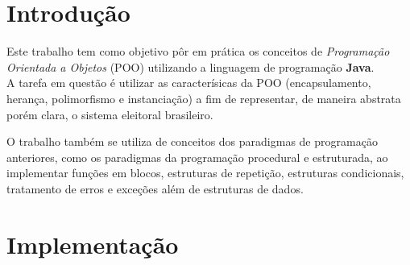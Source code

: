 \documentclass[
		12pt, %
		oneside, %
		a4paper, %
		article, %
		chapter=TITLE, %
		section=TITLE, %
		subsection=TITLE, %
		english, %
		spanish, %
		brazil %
]{abntex2} %
\numberwithin{equation}{section}
\numberwithin{figure}{section}
\numberwithin{table}{section}
\begin{document}

	\frenchspacing %



	\imprimircapa

	\imprimirfolhaderosto* %
	\newpage

	\tableofcontents %
	\newpage

	\textual

	\section{Introdução}

		Este trabalho tem como objetivo pôr em prática os conceitos de \emph{Programação Orientada a Objetos} (POO) utilizando a linguagem de programação \textbf{Java}.
		\\

		A tarefa em questão é utilizar as caracterísicas da POO (encapsulamento, herança, polimorfismo e instanciação) a fim de representar, de maneira abstrata porém clara, o sistema eleitoral brasileiro.

		O trabalho também se utiliza de conceitos dos paradigmas de programação anteriores, como os paradigmas da programação procedural e estruturada, ao implementar funções em blocos, estruturas de repetição, estruturas condicionais, tratamento de erros e exceções além de estruturas de dados.

	\newpage

	\section{Implementação}
\end{document}
